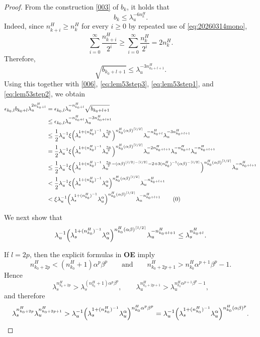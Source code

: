 \documentclass{amsart}
\theoremstyle{plain}
\theoremstyle{definition}
\theoremstyle{remark}
\numberwithin{equation}{section}
\begin{document}
\begin{proof}
From the construction \eqref{003} of $b_k$, it holds that
\[
b_k\le \lambda_u^{-6n_k^H}.
\]
Indeed, since $n_{k+i}^H\ge n_k^H$ for every $i\ge0$ by repeated use of \eqref{eq:20260314mono},
\[
\sum_{i=0}^{\infty}\frac{n_{k+i}^H}{2^i}
\ge
\sum_{i=0}^{\infty}\frac{n_k^H}{2^i}
=
2n_k^H.
\]
Therefore,
\[
\sqrt{b_{k_0+l+1}}\le \lambda_u^{-3n_{k_0+l+1}^H}.
\]
Using this together with \eqref{006}, \eqref{eq:lem53step3}, \eqref{eq:lem53step1}, and \eqref{eq:lem53step2}, we obtain
\label{eq:lem53upper}
\begin{align*}
\epsilon_{k_0,l}b_{k_0+l}\lambda_u^{2n_{k_0+l}^H}
&=
\epsilon_{k_0,l}\lambda_u^{-n_{k_0+l}^H}\sqrt{b_{k_0+l+1}}
\\
&\le
\epsilon_{k_0,l}\lambda_u^{-n_{k_0+l}^H}\lambda_u^{-3n_{k_0+l+1}^H}
\\
&\le
\frac12\lambda_u^{-1}\xi
\Bigl(\lambda_s^{1+(n_{k_0}^H)^{-1}}\lambda_u^{\frac{7\alpha}{2}}\Bigr)^{n_{k_0}^H(\alpha\beta)^{\lceil l/2\rceil}}
\lambda_u^{-n_{k_0+l}^H}\lambda_u^{-3n_{k_0+l+1}^H}
\\
&=
\frac12\lambda_u^{-1}\xi
\Bigl(\lambda_s^{1+(n_{k_0}^H)^{-1}}\lambda_u^{\frac{7\alpha}{2}}\Bigr)^{n_{k_0}^H(\alpha\beta)^{\lceil l/2\rceil}}
\lambda_u^{-2n_{k_0+l+1}^H}\lambda_u^{-n_{k_0+l}^H}\lambda_u^{-n_{k_0+l+1}^H}
\\
&\le
\frac12\lambda_u^{-1}\xi
\Bigl(
\lambda_s^{1+(n_{k_0}^H)^{-1}}
\lambda_u^{\frac{7\alpha}{2}
-(\alpha\beta)^{\lfloor l/2\rfloor-\lceil l/2\rceil}
-2
+3(n_{k_0}^H)^{-1}(\alpha\beta)^{-\lceil l/2\rceil}}
\Bigr)^{n_{k_0}^H(\alpha\beta)^{\lceil l/2\rceil}}
\lambda_u^{-n_{k_0+l+1}^H}
\\
&<
\frac12\lambda_u^{-1}\xi
\Bigl(\lambda_s^{1+(n_{k_0}^H)^{-1}}\lambda_u^{\alpha}\Bigr)^{n_{k_0}^H(\alpha\beta)^{\lceil l/2\rceil}}
\lambda_u^{-n_{k_0+l+1}^H}
\\
&<
\xi\lambda_u^{-1}
\Bigl(\lambda_s^{1+(n_{k_0}^H)^{-1}}\lambda_u^{\alpha}\Bigr)^{n_{k_0}^H(\alpha\beta)^{\lceil l/2\rceil}}
\lambda_u^{-n_{k_0+l+1}^H}
\tag{\theequation}\raisetag{-1.2\baselineskip}
\end{align*}

We next show that
\begin{equation}\label{eq:lem53lower}
\lambda_u^{-1}
\Bigl(\lambda_s^{1+(n_{k_0}^H)^{-1}}\lambda_u^{\alpha}\Bigr)^{n_{k_0}^H(\alpha\beta)^{\lceil l/2\rceil}}
\lambda_u^{-n_{k_0+l+1}^H}
\le
\lambda_s^{n_{k_0+l}^H}.
\end{equation}

If $l=2p$, then the explicit formulas in {\bf OE} imply
\[
n_{k_0+2p}^H<(n_{k_0}^H+1)\alpha^p\beta^p
\qquad\text{and}\qquad
n_{k_0+2p+1}^H>n_{k_0}^H\alpha^{p+1}\beta^p-1.
\]
Hence
\[
\lambda_s^{n_{k_0+2p}^H}
>
\lambda_s^{(n_{k_0}^H+1)\alpha^p\beta^p},
\qquad
\lambda_u^{n_{k_0+2p+1}^H}
>
\lambda_u^{n_{k_0}^H\alpha^{p+1}\beta^p-1},
\]
and therefore
\[
\lambda_s^{n_{k_0+2p}^H}\lambda_u^{n_{k_0+2p+1}^H}
>
\lambda_u^{-1}
\Bigl(\lambda_s^{1+(n_{k_0}^H)^{-1}}\lambda_u^{\alpha}\Bigr)^{n_{k_0}^H\alpha^p\beta^p}
=
\lambda_u^{-1}
\Bigl(\lambda_s^{1+(n_{k_0}^H)^{-1}}\lambda_u^{\alpha}\Bigr)^{n_{k_0}^H(\alpha\beta)^p}.
\]


\end{proof}
\end{document}
